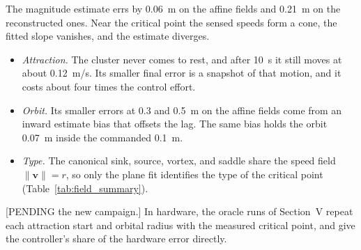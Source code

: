 \documentclass[10pt]{article}
\begin{document}
The magnitude estimate errs by 0.06~m on the affine fields and 0.21~m on the reconstructed ones. Near the critical point the sensed speeds form a cone, the fitted slope vanishes, and the estimate diverges.
\begin{itemize}
\item \emph{Attraction.} The cluster never comes to rest, and after 10~s it still moves at about 0.12~m/s. Its smaller final error is a snapshot of that motion, and it costs about four times the control effort.
\item \emph{Orbit.} Its smaller errors at 0.3 and 0.5~m on the affine fields come from an inward estimate bias that offsets the lag. The same bias holds the orbit 0.07~m inside the commanded 0.1~m.
\item \emph{Type.} The canonical sink, source, vortex, and saddle share the speed field $\|\mathbf{v}\| = r$, so only the plane fit identifies the type of the critical point (Table~\ref{tab:field_summary}).
\end{itemize}

[PENDING the new campaign.] In hardware, the oracle runs of Section~V repeat each attraction start and orbital radius with the measured critical point, and give the controller's share of the hardware error directly.
\end{document}
